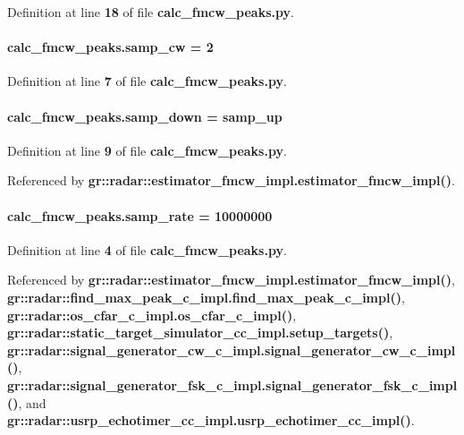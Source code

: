 Definition at line {\bf 18} of file {\bf calc\+\_\+fmcw\+\_\+peaks.\+py}.

\paragraph[{samp\+\_\+cw}]{ calc\+\_\+fmcw\+\_\+peaks.\+samp\+\_\+cw = 2}\label{namespacecalc__fmcw__peaks_a503a7b3d1be3ba5cf7ea571126fb41f4}


Definition at line {\bf 7} of file {\bf calc\+\_\+fmcw\+\_\+peaks.\+py}.

\paragraph[{samp\+\_\+down}]{\setlength{\rightskip}{0pt plus 5cm}calc\+\_\+fmcw\+\_\+peaks.\+samp\+\_\+down = {\bf samp\+\_\+up}}\label{namespacecalc__fmcw__peaks_a604ba0506dc49ec7c496d97692e1e3e6}


Definition at line {\bf 9} of file {\bf calc\+\_\+fmcw\+\_\+peaks.\+py}.



Referenced by {\bf gr\+::radar\+::estimator\+\_\+fmcw\+\_\+impl.\+estimator\+\_\+fmcw\+\_\+impl()}.

\paragraph[{samp\+\_\+rate}]{ calc\+\_\+fmcw\+\_\+peaks.\+samp\+\_\+rate = 10000000}\label{namespacecalc__fmcw__peaks_a7fa77836f446fcf8b8baca87e934e1f8}


Definition at line {\bf 4} of file {\bf calc\+\_\+fmcw\+\_\+peaks.\+py}.



Referenced by {\bf gr\+::radar\+::estimator\+\_\+fmcw\+\_\+impl.\+estimator\+\_\+fmcw\+\_\+impl()}, {\bf gr\+::radar\+::find\+\_\+max\+\_\+peak\+\_\+c\+\_\+impl.\+find\+\_\+max\+\_\+peak\+\_\+c\+\_\+impl()}, {\bf gr\+::radar\+::os\+\_\+cfar\+\_\+c\+\_\+impl.\+os\+\_\+cfar\+\_\+c\+\_\+impl()}, {\bf gr\+::radar\+::static\+\_\+target\+\_\+simulator\+\_\+cc\+\_\+impl.\+setup\+\_\+targets()}, {\bf gr\+::radar\+::signal\+\_\+generator\+\_\+cw\+\_\+c\+\_\+impl.\+signal\+\_\+generator\+\_\+cw\+\_\+c\+\_\+impl()}, {\bf gr\+::radar\+::signal\+\_\+generator\+\_\+fsk\+\_\+c\+\_\+impl.\+signal\+\_\+generator\+\_\+fsk\+\_\+c\+\_\+impl()}, and {\bf gr\+::radar\+::usrp\+\_\+echotimer\+\_\+cc\+\_\+impl.\+usrp\+\_\+echotimer\+\_\+cc\+\_\+impl()}.


